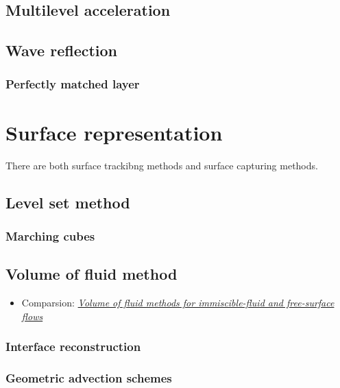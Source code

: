 \documentclass[a4paper]{report}
\begin{document}
\section{Multilevel acceleration}

\section{Wave reflection}

\subsection{Perfectly matched layer}

\chapter{Surface representation}

There are both surface trackibng methods and surface capturing methods.

\section{Level set method}

\subsection{Marching cubes}

\section{Volume of fluid method}

\begin{itemize}
    \item Comparsion: \textit{\href{http://capfluidicslit.mme.pdx.edu/reference/Numerics/Gopala_ChemEngJ2008_VOFMethodsFreeSurfaceFlow.pdf}{Volume of fluid methods for immiscible-fluid and free-surface flows}}
\end{itemize}


\subsection{Interface reconstruction}

\subsection{Geometric advection schemes}
\end{document}
